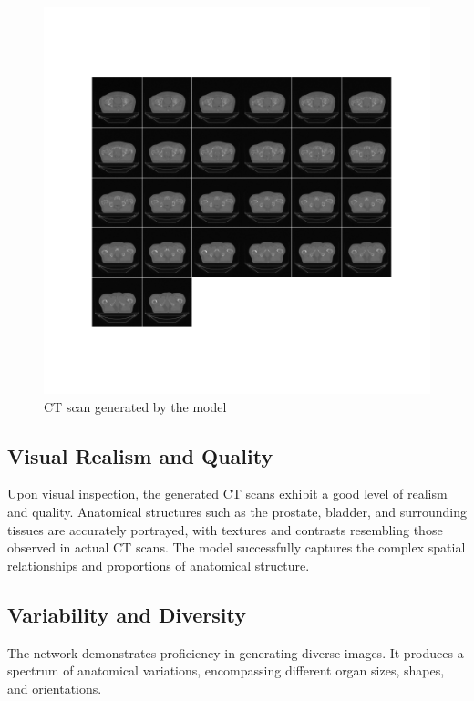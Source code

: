 \documentclass[11pt,a4paper]{report}
\begin{document}
\begin{figure}[H]
	\centering
	\includegraphics[scale=0.55]{images/generatedData3}
    \caption{CT scan generated by the model}
\end{figure}

\subsection{Visual Realism and Quality}
Upon visual inspection, the generated CT scans exhibit a good level of realism and quality. Anatomical structures such as the prostate, bladder, and surrounding tissues are accurately portrayed, with textures and contrasts resembling those observed in actual CT scans. The model successfully captures the complex spatial relationships and proportions of anatomical structure.
\subsection{Variability and Diversity}
The network demonstrates proficiency in generating diverse images. It produces a spectrum of anatomical variations, encompassing different organ sizes, shapes, and orientations.
\end{document}
